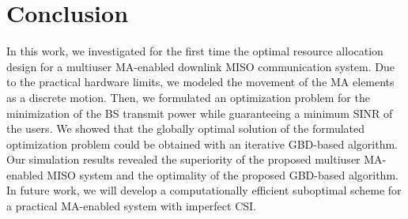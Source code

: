 \documentclass[12pt, draftclsnofoot, onecolumn]{IEEEtran}
\begin{document}
\section{Conclusion}
In this work, we investigated for the first time the optimal resource allocation design for a multiuser MA-enabled downlink MISO communication system. Due to the practical hardware limits, we modeled the movement of the MA elements as a discrete motion. Then, we formulated an optimization problem for the minimization of the BS transmit power while guaranteeing a minimum SINR of the users. We showed that the globally optimal solution of the formulated optimization problem could be obtained with an iterative GBD-based algorithm. Our simulation results revealed the superiority of the proposed multiuser MA-enabled MISO system and the optimality of the proposed GBD-based algorithm. In future work, we will develop a computationally efficient suboptimal scheme for a practical MA-enabled system with imperfect CSI.


\end{document}
